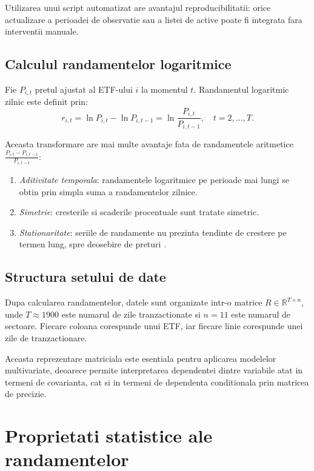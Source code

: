 Utilizarea unui script automatizat are avantajul reproducibilitatii: orice
actualizare a perioadei de observatie sau a listei de active poate fi integrata
fara interventii manuale.

\subsection{Calculul randamentelor logaritmice}

Fie $P_{i,t}$ pretul ajustat al ETF-ului $i$ la momentul $t$. Randamentul
logaritmic zilnic este definit prin:
\begin{equation}
    r_{i,t} = \ln P_{i,t} - \ln P_{i,t-1} = \ln\frac{P_{i,t}}{P_{i,t-1}},
    \quad t = 2, \ldots, T.
    \label{eq:logreturns}
\end{equation}

Aceasta transformare are mai multe avantaje fata de randamentele aritmetice
$\frac{P_{i,t} - P_{i,t-1}}{P_{i,t-1}}$:
\begin{enumerate}
    \item \textit{Aditivitate temporala}: randamentele logaritmice pe perioade
    mai lungi se obtin prin simpla suma a randamentelor zilnice.
    \item \textit{Simetrie}: cresterile si scaderile procentuale sunt tratate
    simetric.
    \item \textit{Stationaritate}: seriile de randamente nu prezinta tendinte
    de crestere pe termen lung, spre deosebire de preturi \citep{tsay2010}.
\end{enumerate}

\subsection{Structura setului de date}

Dupa calcularea randamentelor, datele sunt organizate intr-o matrice
$R \in \mathbb{R}^{T \times n}$, unde $T \approx 1900$ este numarul de zile
tranzactionate si $n = 11$ este numarul de sectoare. Fiecare coloana corespunde
unui ETF, iar fiecare linie corespunde unei zile de tranzactionare.

Aceasta reprezentare matriciala este esentiala pentru aplicarea modelelor multivariate, deoarece permite interpretarea dependentei dintre variabile atat in termeni de covarianta, cat si in termeni de dependenta conditionala prin matricea de precizie.

\section{Proprietati statistice ale randamentelor}

